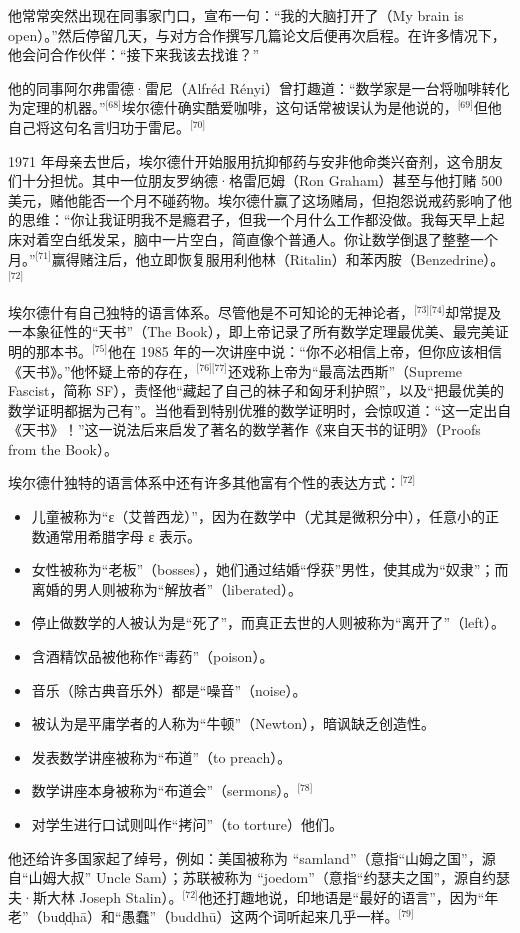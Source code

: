 他常常突然出现在同事家门口，宣布一句：“我的大脑打开了（My brain is open）。”然后停留几天，与对方合作撰写几篇论文后便再次启程。在许多情况下，他会问合作伙伴：“接下来我该去找谁？”

他的同事阿尔弗雷德·雷尼（Alfréd Rényi）曾打趣道：“数学家是一台将咖啡转化为定理的机器。”\(^\text{[68]}\)埃尔德什确实酷爱咖啡，这句话常被误认为是他说的，\(^\text{[69]}\)但他自己将这句名言归功于雷尼。\(^\text{[70]}\)

1971 年母亲去世后，埃尔德什开始服用抗抑郁药与安非他命类兴奋剂，这令朋友们十分担忧。其中一位朋友罗纳德·格雷厄姆（Ron Graham）甚至与他打赌 500 美元，赌他能否一个月不碰药物。埃尔德什赢了这场赌局，但抱怨说戒药影响了他的思维：“你让我证明我不是瘾君子，但我一个月什么工作都没做。我每天早上起床对着空白纸发呆，脑中一片空白，简直像个普通人。你让数学倒退了整整一个月。”\(^\text{[71]}\)赢得赌注后，他立即恢复服用利他林（Ritalin）和苯丙胺（Benzedrine）。\(^\text{[72]}\)

埃尔德什有自己独特的语言体系。尽管他是不可知论的无神论者，\(^\text{[73][74]}\)却常提及一本象征性的“天书”（The Book），即上帝记录了所有数学定理最优美、最完美证明的那本书。\(^\text{[75]}\)他在 1985 年的一次讲座中说：“你不必相信上帝，但你应该相信《天书》。”他怀疑上帝的存在，\(^\text{[76][77]}\)还戏称上帝为“最高法西斯”（Supreme Fascist，简称 SF），责怪他“藏起了自己的袜子和匈牙利护照”，以及“把最优美的数学证明都据为己有”。当他看到特别优雅的数学证明时，会惊叹道：“这一定出自《天书》！”这一说法后来启发了著名的数学著作《来自天书的证明》（Proofs from the Book）。

埃尔德什独特的语言体系中还有许多其他富有个性的表达方式：\(^\text{[72]}\)
\begin{itemize}
\item 儿童被称为“ε（艾普西龙）”，因为在数学中（尤其是微积分中），任意小的正数通常用希腊字母 ε 表示。
\item 女性被称为“老板”（bosses），她们通过结婚“俘获”男性，使其成为“奴隶”；而离婚的男人则被称为“解放者”（liberated）。
\item 停止做数学的人被认为是“死了”，而真正去世的人则被称为“离开了”（left）。
\item 含酒精饮品被他称作“毒药”（poison）。
\item 音乐（除古典音乐外）都是“噪音”（noise）。
\item 被认为是平庸学者的人称为“牛顿”（Newton），暗讽缺乏创造性。
\item 发表数学讲座被称为“布道”（to preach）。
\item 数学讲座本身被称为“布道会”（sermons）。\(^\text{[78]}\)
\item 对学生进行口试则叫作“拷问”（to torture）他们。
\end{itemize}
他还给许多国家起了绰号，例如：美国被称为 “samland”（意指“山姆之国”，源自“山姆大叔” Uncle Sam）；苏联被称为 “joedom”（意指“约瑟夫之国”，源自约瑟夫·斯大林 Joseph Stalin）。\(^\text{[72]}\)他还打趣地说，印地语是“最好的语言”，因为“年老”（bud̩d̩hā）和“愚蠢”（buddhū）这两个词听起来几乎一样。\(^\text{[79]}\)
